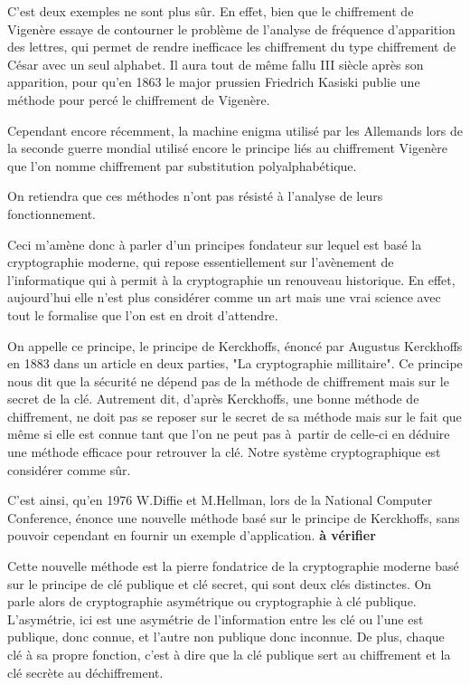 C'est deux exemples ne sont plus sûr. En effet, bien que le chiffrement de Vigenère essaye de
contourner le problème de l'analyse de fréquence d'apparition des lettres, qui permet de rendre
inefficace les chiffrement du type chiffrement de César avec un seul alphabet. Il aura tout de
même fallu III
siècle après son apparition, pour qu'en 1863 le major prussien Friedrich Kasiski publie une
méthode pour percé le chiffrement de Vigenère.

Cependant encore récemment, la machine enigma utilisé par les Allemands lors de la seconde
guerre mondial utilisé encore le principe liés au chiffrement Vigenère que l'on nomme chiffrement
par substitution polyalphabétique.

On retiendra que ces méthodes n'ont pas résisté à l'analyse de leurs
fonctionnement.

Ceci m'amène donc à parler d'un principes fondateur sur lequel est basé la cryptographie
moderne, qui repose essentiellement sur l'avènement de l'informatique qui à permit à la
cryptographie un renouveau historique. En effet, aujourd'hui elle n'est plus considérer comme
un art mais une vrai science avec tout le formalise que l'on est en droit d'attendre.

On appelle ce principe, le principe de Kerckhoffs, énoncé par Augustus Kerckhoffs en 1883 dans
un article en deux parties, "La cryptographie millitaire". Ce principe nous dit que la sécurité
ne dépend pas de la méthode de chiffrement mais sur le secret de la clé. Autrement dit, d'après
Kerckhoffs, une bonne méthode de chiffrement, ne doit pas se reposer sur le secret de sa
méthode mais sur le fait que même si elle est connue tant que l'on ne peut pas à partir de
celle-ci en déduire une méthode efficace pour retrouver la clé. Notre système
cryptographique est considérer comme sûr. 

C'est ainsi, qu'en 1976 W.Diffie et M.Hellman, lors de la National Computer Conference,
énonce une nouvelle méthode basé sur le principe de Kerckhoffs, sans pouvoir
cependant en fournir un exemple d'application.
\textbf{à vérifier}

Cette nouvelle méthode est la pierre fondatrice de la cryptographie moderne basé sur le
principe de clé publique et clé secret, qui sont deux clés distinctes. On parle alors de cryptographie asymétrique ou
cryptographie à clé publique.
L'asymétrie, ici est une asymétrie de l'information entre les clé ou l'une est publique, donc
connue, et l'autre non publique donc inconnue. De plus, chaque clé à sa propre fonction,
c'est à dire que la clé publique sert au chiffrement et la clé secrète au déchiffrement.

